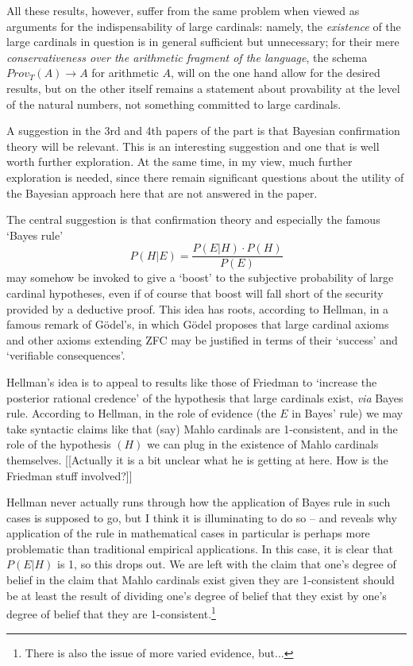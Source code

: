 \documentclass{asl}
\theoremstyle{definition}
\begin{document}
All these results, however, suffer from the same problem when viewed as arguments for the indispensability of large cardinals: namely, the \emph{existence} of the large cardinals in question is in general sufficient but unnecessary; for their mere \emph{conservativeness over the arithmetic fragment of the language}, the schema $Prov_T(A) \rightarrow A$ for arithmetic $A$, will on the one hand allow for the desired results, but on the other itself remains a statement about provability at the level of the natural numbers, not something committed to large cardinals.

A suggestion in the 3rd and 4th papers of the part is that Bayesian confirmation theory will be relevant. This is an interesting suggestion and one that is well worth further exploration. At the same time, in my view, much further exploration is needed, since there remain significant questions about the utility of the Bayesian approach here that are not answered in the paper.

The central suggestion is that confirmation theory and especially the famous `Bayes rule'
\begin{equation}
P(H|E) = \frac{P(E|H)\cdot P(H)}{P(E)}
\end{equation}
may somehow be invoked to give a `boost' to the subjective probability of large cardinal hypotheses, even if of course that boost will fall short of the security provided by a deductive proof. This idea has roots, according to Hellman, in a famous remark of G\"odel's, in which G\"odel proposes that large cardinal axioms and other axioms extending ZFC may be justified in terms of their `success' and `verifiable consequences'.

Hellman's idea is to appeal to results like those of Friedman to `increase the posterior rational credence' of the hypothesis that large cardinals exist, \emph{via}  Bayes rule. According to Hellman, in the role of evidence (the $E$ in Bayes' rule) we may take syntactic claims like that (say) Mahlo cardinals are 1-consistent, and in the role of the hypothesis  $(H)$ we can plug in the existence of Mahlo cardinals themselves. [[Actually it is a bit unclear what he is getting at here. How is the Friedman stuff involved?]]

Hellman never actually runs through how the application of Bayes rule in such cases is supposed to go, but I think it is illuminating to do so -- and reveals why application of the rule in mathematical cases in particular is perhaps more problematic than traditional empirical applications. In this case, it is clear that $P(E|H)$ is 1, so this drops out. We are left with the claim that one's degree of belief in the claim that Mahlo cardinals exist given they are 1-consistent should be at least the result of dividing one's degree of belief that they exist by one's degree of belief that they are 1-consistent.\footnote{There is also the issue of more varied evidence, but...}
\end{document}
